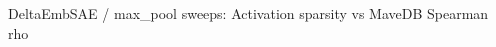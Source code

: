 \documentclass{article}
\begin{document}
\fontsize{13.0}{16.25}%
\ifdefined\psfrag\else\hbox{}\fi%
{\rmfamily DeltaEmbSAE / max\_pool sweeps: Activation sparsity vs MaveDB Spearman rho}%
\end{document}
